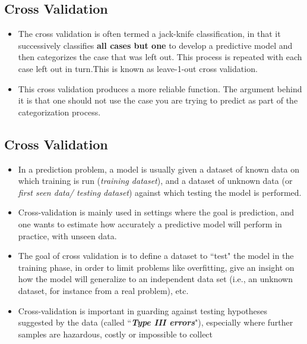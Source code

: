 \subsection{Cross Validation}
\begin{itemize}	
%	
	\item The cross validation is often termed a jack-knife classification, in that
	it successively classifies \textbf{all cases but one} to develop a predictive model and then
	categorizes the case that was left out. This process is repeated with each case left out in
	turn.This is known as leave-1-out cross validation. 
	
	\item 	This cross validation produces a more reliable function. The argument behind it is that
	one should not use the case you are trying to predict as part of the categorization process.
\end{itemize}







\subsection{Cross Validation}
\begin{itemize}
\item In a prediction problem, a model is usually given a dataset of known data 
on which training is run (\textit{training dataset}), and a dataset of unknown data (or \textit{first seen data/ testing dataset}) against which testing the model is performed.
\item Cross-validation is mainly used in settings where the goal is prediction, and one wants to estimate how accurately a predictive model will perform in practice, with unseen data.
\item The goal of cross validation is to define a dataset to ``test" the model in the training phase, in order to limit problems like overfitting, give an insight on how the model will generalize to an independent data set (i.e., an unknown dataset, for instance from a real problem), etc.
\item Cross-validation is important in guarding against testing hypotheses suggested by the data (called ``\textbf{\textit{Type III errors}}"), especially where further samples 
are hazardous, costly or impossible to collect 
\end{itemize}
